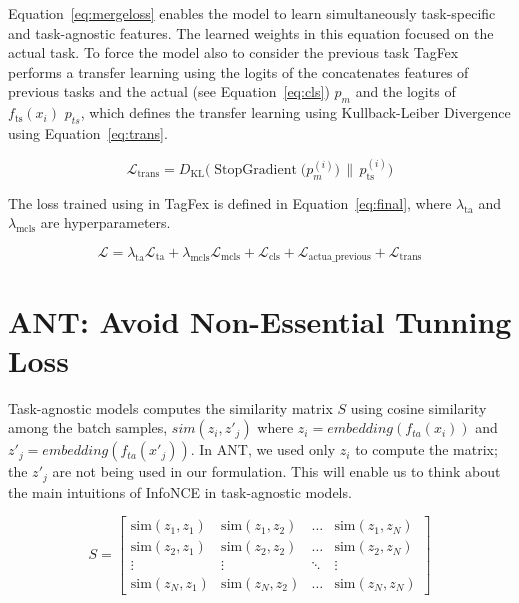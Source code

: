 \documentclass[letterpaper]{article} %
\begin{document}
Equation~\ref{eq:mergeloss} enables the model to learn simultaneously task-specific and task-agnostic features.  The learned weights in this equation focused on the actual task. To force the model also to consider the previous task TagFex performs a transfer learning using the logits of the concatenates features of previous tasks and the actual (see Equation~\ref{eq:cls}) $p_m$ and the logits of $f_{\text{ts}}(x_i)$ $p_{ts}$, which defines the transfer learning using Kullback-Leiber Divergence using Equation~\ref{eq:trans}.

\begin{equation}\label{eq:trans}
\mathcal{L}_{\text{trans}} 
= D_{\mathrm{KL}}\!\bigl(\operatorname{StopGradient}\bigl(p_m^{(i)}\bigr)\,\big\|\,p_{\text{ts}}^{(i)}\bigr)
\end{equation}

The loss trained using in TagFex is defined in Equation~\ref{eq:final}, where $\lambda_{\text{ta}}$ and $\lambda_{\text{mcls}}$ are hyperparameters.


\begin{equation}\label{eq:final}
\mathcal{L} = \lambda_{\text{ta}} \mathcal{L}_{\text{ta}} + \lambda_{\text{mcls}} \mathcal{L}_{\text{mcls}} + \mathcal{L}_{\text{cls}}+ \mathcal{L}_{\text{actua\_previous}}+ \mathcal{L}_{\text{trans}}
\end{equation}


\section{ANT: Avoid Non-Essential Tunning Loss}


Task-agnostic models computes the similarity matrix $S$ using cosine similarity among the batch samples, $sim(z_i,z'_j)$ where $z_i = embedding(f_{ta}(x_i))$ and $z'_j = embedding(f_{ta}(x'_j))$. In ANT, we used only $z_i$ to compute the matrix; the $z'_j$ are not being used in our formulation. This will enable us to think about the main intuitions of InfoNCE in task-agnostic models. 


\begin{equation}
S = 
\begin{bmatrix}
\mathrm{sim}(z_1, z_1) & \mathrm{sim}(z_1, z_2) & \dots & \mathrm{sim}(z_1, z_N) \\
\mathrm{sim}(z_2, z_1) & \mathrm{sim}(z_2, z_2) & \dots & \mathrm{sim}(z_2, z_N) \\
\vdots & \vdots & \ddots & \vdots \\
\mathrm{sim}(z_N, z_1) & \mathrm{sim}(z_N, z_2) & \dots & \mathrm{sim}(z_N, z_N)
\end{bmatrix}
\end{equation}
\end{document}
